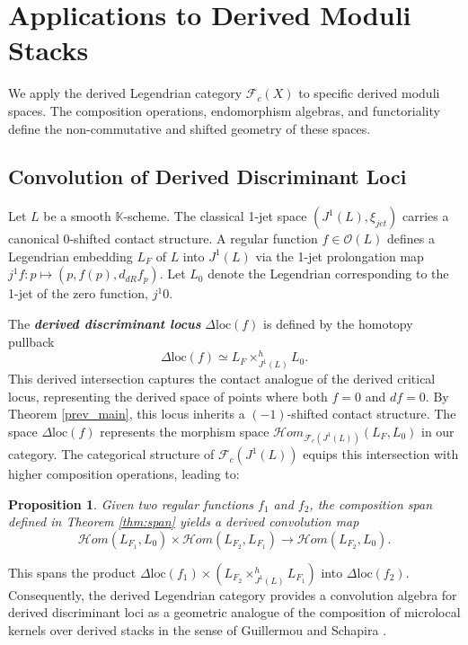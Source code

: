 \documentclass[reqno]{amsart}
\newcommand{\bfem}[1]{\textbf{\textit{#1}}}
\newcommand{\cO}{\mathcal{O}}
\newcommand{\K}{\mathbb{K}}
\newtheorem{proposition}[theorem]{Proposition}
\begin{document}
\section{Applications to Derived Moduli Stacks}\label{sec:applications}

We apply the derived Legendrian category $\mathcal{F}_{c}(X)$ to specific derived moduli spaces. The composition operations, endomorphism algebras, and functoriality define the non-commutative and shifted geometry of these spaces.

\subsection{Convolution of Derived Discriminant Loci}
Let $L$ be a smooth $\K$-scheme. The classical 1-jet space $(J^1(L), \xi_{jet})$ carries a canonical $0$-shifted contact structure. A regular function $f \in \cO(L)$ defines a Legendrian embedding $L_F$ of $L$ into $J^1(L)$ via the 1-jet prolongation map $j^1f \colon p \mapsto (p, f(p), d_{dR}f_p)$. Let $L_0$ denote the Legendrian corresponding to the 1-jet of the zero function, $j^1 0$. 

The \bfem{derived discriminant locus} $\Delta\mathrm{loc}(f)$ is defined by the homotopy pullback
\[
    \Delta\mathrm{loc}(f) \simeq L_F \times_{J^1(L)}^h L_0.
\]
This derived intersection captures the contact analogue of the derived critical locus, representing the derived space of points where both $f=0$ and $df=0$. By Theorem \ref{prev_main}, this locus inherits a $(-1)$-shifted contact structure. The space $\Delta\mathrm{loc}(f)$ represents the morphism space $\mathcal{H}om_{\mathcal{F}_{c}(J^1(L))}(L_F, L_0)$ in our category. 
The categorical structure of $\mathcal{F}_{c}(J^1(L))$ equips this intersection with higher composition operations, leading to: 
\begin{proposition}\label{prop: disclocus}
 Given two regular functions $f_1$ and $f_2$, the composition span defined in Theorem \ref{thm:span} yields a derived convolution map
\[
    \mathcal{H}om(L_{F_1}, L_0) \times \mathcal{H}om(L_{F_2}, L_{F_1}) \to \mathcal{H}om(L_{F_2}, L_0).
\]   
\end{proposition}
This spans the product $\Delta\mathrm{loc}(f_1) \times (L_{F_2} \times_{J^1(L)}^h L_{F_1})$ into $\Delta\mathrm{loc}(f_2)$. Consequently, the derived Legendrian category provides a convolution algebra for derived discriminant loci as a geometric analogue of the composition of microlocal kernels over derived stacks in the sense of Guillermou and Schapira \cite{GuillermouSchapira}.
\end{document}
